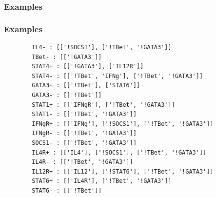 \documentclass{beamer}
\begin{document}
	\begin{frame}
		\frametitle{Examples}
			\begin{figure}[htbp]
				
			\end{figure}%
	\end{frame}
	\begin{frame}
		\small
	\frametitle{Examples}
	\begin{figure}[htbp]
		
	\end{figure}%
\end{frame}
\begin{frame}[fragile=singleslide]
	\begin{verbatim}
		IL4- : [['!SOCS1'], ['!TBet', '!GATA3']]
		TBet- : [['!GATA3']]
		STAT4+ : [['!GATA3'], ['IL12R']]
		STAT4- : [['!TBet', 'IFNg'], ['!TBet', '!GATA3']]
		GATA3+ : [['!TBet'], ['STAT6']]
		GATA3- : [['!TBet']]
		STAT1+ : [['IFNgR'], ['!TBet', '!GATA3']]
		STAT1- : [['!TBet', '!GATA3']]
		IFNgR+ : [['IFNg'], ['!SOCS1'], ['!TBet', '!GATA3']]
		IFNgR- : [['!TBet', '!GATA3']]
		SOCS1- : [['!TBet', '!GATA3']]
		IL4R+ : [['IL4'], ['!SOCS1'], ['!TBet', '!GATA3']]
		IL4R- : [['!TBet', '!GATA3']]
		IL12R+ : [['IL12'], ['!STAT6'], ['!TBet', '!GATA3']]
		STAT6+ : [['IL4R'], ['!TBet', '!GATA3']]
		STAT6- : [['!TBet']]
	\end{verbatim}
\end{frame}
\end{document}
